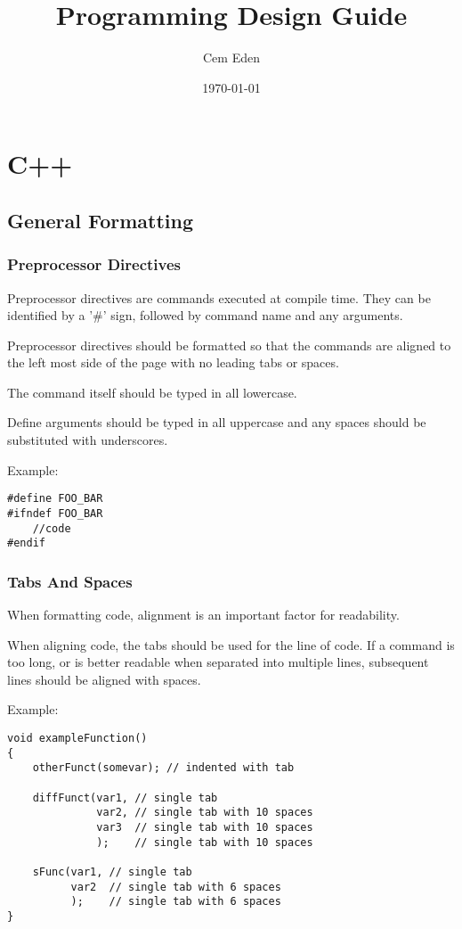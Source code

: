 \documentclass[12pt,article]{memoir}
\title{Programming Design Guide}
\author{Cem Eden}
\date{\today}
\begin{document}
	


\tableofcontents*
\clearpage


\chapter{C++}
\section{General Formatting}
\subsection{Preprocessor Directives}
\label{subsec:preprocessorDirectives}
Preprocessor directives are commands executed at compile time. They can be identified by a '\#' sign, followed by command name and any arguments.\par
Preprocessor directives should be formatted so that the commands are aligned  to the left most side of the page with no leading tabs or spaces.\par
The command itself should be typed in all lowercase.\par
Define arguments should be typed in all uppercase and any spaces should be substituted with underscores.\par
Example:
\begin{lstlisting}
#define FOO_BAR
#ifndef FOO_BAR
	//code
#endif
\end{lstlisting}

\newpage
\subsection{Tabs And Spaces}
When formatting code, alignment is an important factor for readability.\par
When aligning code, the tabs should be used for the line of code. If a command is too long, or is better readable when separated into multiple lines, subsequent lines should be aligned with spaces.\par
Example:
\begin{lstlisting}
void exampleFunction()
{
	otherFunct(somevar); // indented with tab

	diffFunct(var1, // single tab
	          var2, // single tab with 10 spaces
	          var3  // single tab with 10 spaces
	          );	// single tab with 10 spaces
	          
	sFunc(var1, // single tab
	      var2  // single tab with 6 spaces 
	      );    // single tab with 6 spaces
}
\end{lstlisting}
\end{document}
